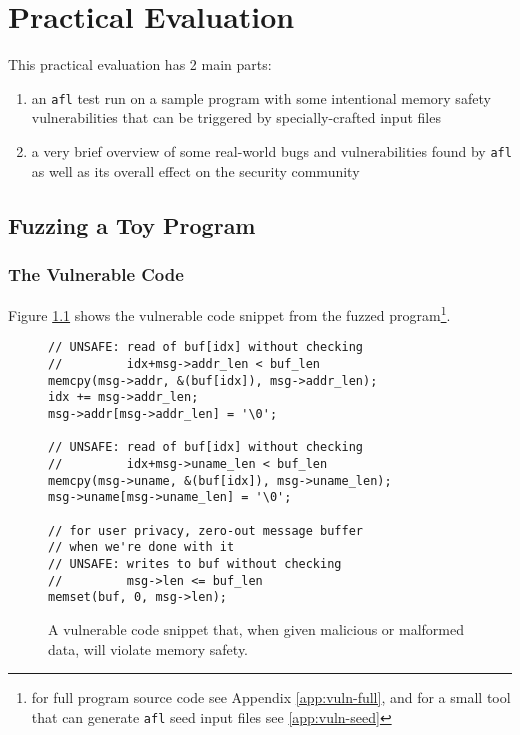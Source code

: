 \chapter{Practical Evaluation}

This practical evaluation has 2 main parts:
\begin{enumerate}
    \item an \texttt{afl} test run on a sample program with some intentional
    memory safety vulnerabilities that can be triggered by specially-crafted
    input files
    \item a very brief overview of some real-world bugs and vulnerabilities
    found by \texttt{afl} as well as its overall effect on the security
    community
\end{enumerate}

\section{Fuzzing a Toy Program}


\subsection{The Vulnerable Code}

Figure \ref{fig:vuln-snippet} shows the vulnerable code snippet from
the fuzzed program\footnote{for full program source code see Appendix
\ref{app:vuln-full}, and for a small tool that can generate \texttt{afl}
seed input files see \ref{app:vuln-seed}}.

\begin{figure}[H]
    \begin{lstlisting}[language={[ANSI]C}]
// UNSAFE: read of buf[idx] without checking
//         idx+msg->addr_len < buf_len
memcpy(msg->addr, &(buf[idx]), msg->addr_len);
idx += msg->addr_len;
msg->addr[msg->addr_len] = '\0';

// UNSAFE: read of buf[idx] without checking
//         idx+msg->uname_len < buf_len
memcpy(msg->uname, &(buf[idx]), msg->uname_len);
msg->uname[msg->uname_len] = '\0';                                         

// for user privacy, zero-out message buffer
// when we're done with it
// UNSAFE: writes to buf without checking
//         msg->len <= buf_len
memset(buf, 0, msg->len);
\end{lstlisting}
\caption{A vulnerable code snippet that, when given malicious or malformed data, will violate memory safety.}
\label{fig:vuln-snippet}
\end{figure}

